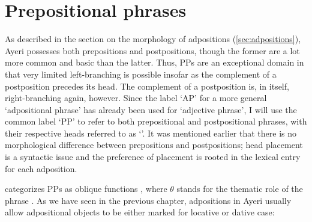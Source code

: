 \section{Prepositional phrases}
\label{sec:pps}

As described in the section on the morphology of adpositions
(\autoref{sec:adpositions}), Ayeri possesses both prepositions and
postpositions, though the former are a lot more common and basic than the
latter. Thus, PPs are an exceptional domain in that very limited left-branching
is possible insofar as the complement of a postposition precedes its head. The
complement of a postposition is, in itself, right-branching again, however.
Since the label `AP' for a more general `adpositional phrase' has already been
used for `adjective phrase', I will use the common label `PP' to refer to both
prepositional and postpositional phrases, with their respective heads referred
to as `'. It was mentioned earlier that there is no morphological
difference between prepositions and postpositions; head placement is a
syntactic issue and the preference of placement is rooted in the lexical entry
for each adposition.

\Lfg{} categorizes PPs as oblique functions 
\Oblique{}, where $\theta$ stands for the thematic role of the phrase
\citep[9--10]{dalrymple2001}. As we have seen in the previous chapter,
adpositions in Ayeri usually allow adpositional objects to be either marked for
locative or dative case:

